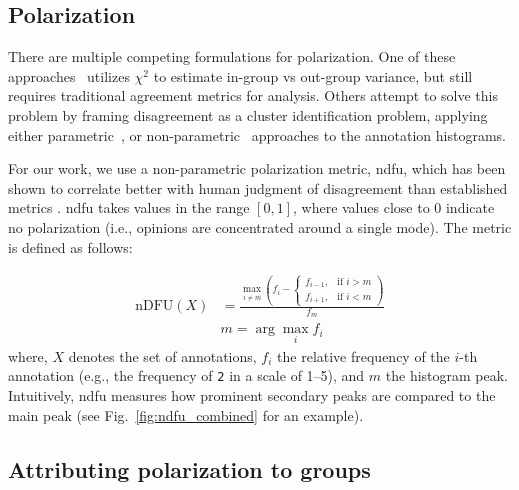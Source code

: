 \documentclass{article} %
\theoremstyle{definition}
\theoremstyle{plain}
\begin{document}
\subsection{Polarization}
\label{sec:related:polarization}

There are multiple competing formulations for polarization. One of these approaches~\cite{akhtar_2019} utilizes $\chi^2$ to estimate in-group vs out-group variance, but still requires traditional agreement metrics for analysis.
Others attempt to solve this problem by framing disagreement as a cluster identification problem, applying either parametric~\cite{checco_2017}, or non-parametric~\cite{pavlopoulos-likas-2024, Mignemi2024} approaches to the annotation histograms. 

For our work, we use a non-parametric polarization metric, \ac{ndfu}, which has been shown to correlate better with human judgment of disagreement than established metrics \citep{pavlopoulos-likas-2024}. \ac{ndfu} takes values in the range $[0,1]$, where values close to $0$ indicate no polarization (i.e., opinions are concentrated around a single mode). The metric is defined as follows:

\begin{equation}
	\label{eq:ndfu}
	\begin{aligned}
		\mathrm{nDFU}(X)
		&=
		\frac{
			\displaystyle
			\max_{i \neq m}
			\left(
			f_i -
			\begin{cases}
				f_{i-1}, & \text{if } i > m \\
				f_{i+1}, & \text{if } i < m
			\end{cases}
			\right)
		}{
			f_m
		} \\
		& m = \arg\max_i f_i
	\end{aligned}
\end{equation}
\noindent where, $X$ denotes the set of annotations, $f_i$ the relative frequency of the $i$-th annotation (e.g., the frequency of \texttt{2} in a scale of 1--5), and $m$ the histogram peak. Intuitively, \ac{ndfu} measures how prominent secondary peaks are compared to the main peak (see Fig.~\ref{fig:ndfu_combined} for an example).


\subsection{Attributing polarization to groups}
\label{sec:related:attribution}
\end{document}
